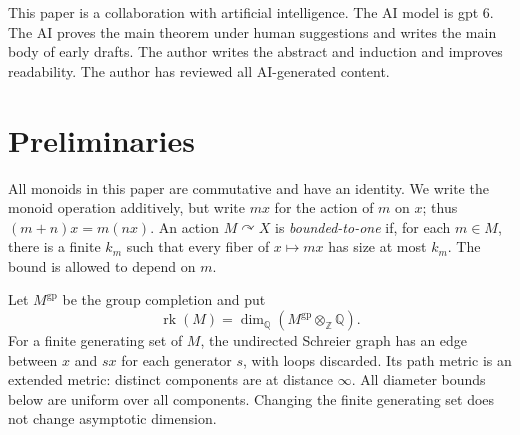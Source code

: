 \documentclass[11pt,letterpaper]{article}
\theoremstyle{definition}
\newtheorem{remark}[theorem]{Remark}
\DeclareMathOperator{\rk}{rk}
\newcommand{\ZZ}{\mathbb Z}
\newcommand{\QQ}{\mathbb Q}
\newcommand{\gp}{\mathrm{gp}}
\newcommand{\act}{\curvearrowright}
\begin{document}

This paper is a collaboration with artificial intelligence. The AI model is gpt 6. The AI proves the main theorem under human suggestions and writes the main body of early drafts. The author writes the abstract and induction and improves readability. The author has reviewed all AI-generated content.


\section{Preliminaries}

All monoids in this paper are commutative and have an identity. We write
the monoid operation additively, but write $mx$ for the action of $m$ on
$x$; thus $(m+n)x=m(nx)$. An action $M\act X$ is
\emph{bounded-to-one} if, for each $m\in M$, there is a finite $k_m$ such
that every fiber of $x\mapsto mx$ has size at most $k_m$. The bound is
allowed to depend on $m$.

Let $M^{\gp}$ be the group completion and put
\[
  \rk(M)=\dim_{\QQ}(M^{\gp}\otimes_{\ZZ}\QQ).
\]
For a finite generating set of $M$, the undirected Schreier graph has an
edge between $x$ and $sx$ for each generator $s$, with loops discarded.
Its path metric is an extended metric: distinct components are at distance
$\infty$. All diameter bounds below are uniform over all components.
Changing the finite generating set does not change asymptotic dimension.

\end{document}
